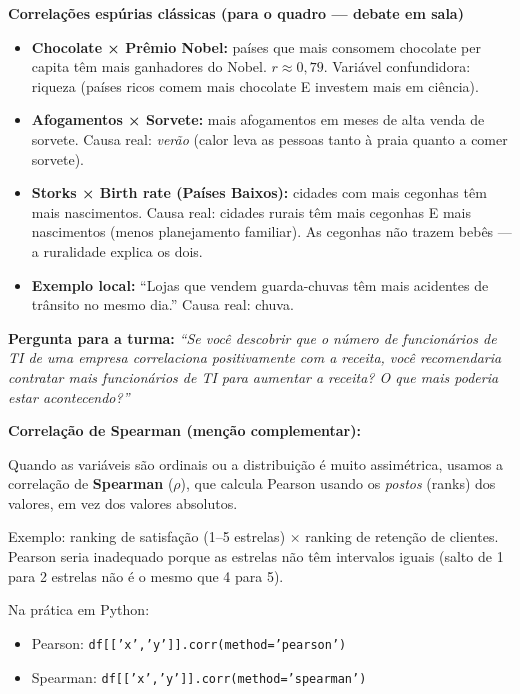 \begin{BoardBox}
\textbf{Correlações espúrias clássicas (para o quadro — debate em sala)}
\begin{itemize}
  \item \textbf{Chocolate × Prêmio Nobel:} países que mais consomem chocolate per capita
  têm mais ganhadores do Nobel. $r \approx 0{,}79$. Variável confundidora: riqueza
  (países ricos comem mais chocolate E investem mais em ciência).
  \item \textbf{Afogamentos × Sorvete:} mais afogamentos em meses de alta venda de sorvete.
  Causa real: \emph{verão} (calor leva as pessoas tanto à praia quanto a comer sorvete).
  \item \textbf{Storks × Birth rate (Países Baixos):} cidades com mais cegonhas têm mais
  nascimentos. Causa real: cidades rurais têm mais cegonhas E mais nascimentos (menos
  planejamento familiar). As cegonhas não trazem bebês — a ruralidade explica os dois.
  \item \textbf{Exemplo local:} ``Lojas que vendem guarda-chuvas têm mais acidentes de
  trânsito no mesmo dia.'' Causa real: chuva.
\end{itemize}

\textbf{Pergunta para a turma:} \textit{``Se você descobrir que o número de funcionários
de TI de uma empresa correlaciona positivamente com a receita, você recomendaria
contratar mais funcionários de TI para aumentar a receita? O que mais poderia
estar acontecendo?''}
\end{BoardBox}

\begin{SolvedBox}
\textbf{Correlação de Spearman (menção complementar):}

Quando as variáveis são ordinais ou a distribuição é muito assimétrica,
usamos a correlação de \textbf{Spearman} ($\rho$), que calcula Pearson usando
os \emph{postos} (ranks) dos valores, em vez dos valores absolutos.

Exemplo: ranking de satisfação (1–5 estrelas) × ranking de retenção de clientes.
Pearson seria inadequado porque as estrelas não têm intervalos iguais (salto de
1 para 2 estrelas não é o mesmo que 4 para 5).

Na prática em Python:
\begin{itemize}
  \item Pearson: \texttt{df[['x','y']].corr(method='pearson')}
  \item Spearman: \texttt{df[['x','y']].corr(method='spearman')}
\end{itemize}
\end{SolvedBox}

